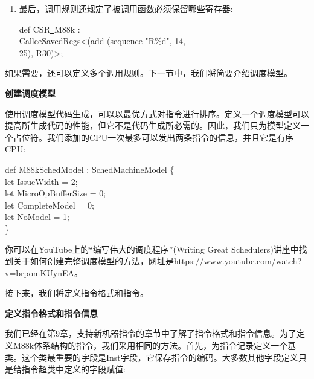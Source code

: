 \begin{enumerate}
\item 最后，调用规则还规定了被调用函数必须保留哪些寄存器:
\begin{tcolorbox}[colback=white,colframe=black]
def CSR\underline{~}M88k : \\
\hspace*{1.5cm}CalleeSavedRegs<(add (sequence "R\%d", 14, \\
\hspace*{2cm}25), R30)>;
\end{tcolorbox}

\end{enumerate}

如果需要，还可以定义多个调用规则。下一节中，我们将简要介绍调度模型。\par


\hspace*{\fill} \par %
\textbf{创建调度模型}

使用调度模型代码生成，可以以最优方式对指令进行排序。定义一个调度模型可以提高所生成代码的性能，但它不是代码生成所必需的。因此，我们只为模型定义一个占位符。我们添加的CPU一次最多可以发出两条指令的信息，并且它是有序CPU:\par

\begin{tcolorbox}[colback=white,colframe=black]
def M88kSchedModel : SchedMachineModel \{ \\
\hspace*{1cm}let IssueWidth = 2; \\
\hspace*{1cm}let MicroOpBufferSize = 0; \\
\hspace*{1cm}let CompleteModel = 0; \\
\hspace*{1cm}let NoModel = 1; \\
\}
\end{tcolorbox}

你可以在YouTube上的“编写伟大的调度程序”(Writing Great Schedulers)讲座中找到关于如何创建完整调度模型的方法，网址是\url{https://www.youtube.com/watch?v=brpomKUynEA}。\par

接下来，我们将定义指令格式和指令。\par

\hspace*{\fill} \par %
\textbf{定义指令格式和指令信息}

我们已经在第9章，支持新机器指令的章节中了解了指令格式和指令信息。为了定义M88k体系结构的指令，我们采用相同的方法。首先，为指令记录定义一个基类。这个类最重要的字段是Inst字段，它保存指令的编码。大多数其他字段定义只是给指令超类中定义的字段赋值:\par

